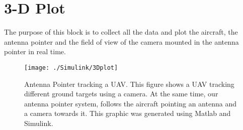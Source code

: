 \section{3-D Plot}

The purpose of this block is to collect all the data and plot the aircraft, the antenna pointer and the field of view of the camera mounted in the antenna pointer in real time.
\begin{figure}[h!]
  \centering
  \texttt{[image: ./Simulink/3Dplot]}
  \label{fig:3dplot}
  \caption[Antenna Pointer tracking a UAV.]{Antenna Pointer tracking a UAV. This figure shows a UAV tracking different ground targets using a camera. At the same time, our antenna pointer system, follows the aircraft pointing an antenna and a camera towards it. This graphic was generated using Matlab and Simulink.}
\end{figure}